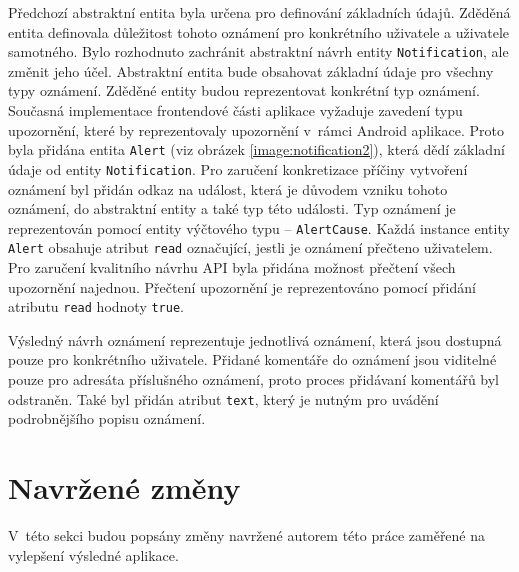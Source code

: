         Předchozí abstraktní entita byla určena pro definování základních údajů. Zděděná entita definovala důležitost tohoto oznámení pro konkrétního uživatele a uživatele samotného. Bylo rozhodnuto zachránit abstraktní návrh entity \verb|Notification|, ale změnit jeho účel. Abstraktní entita bude obsahovat základní údaje pro všechny typy oznámení. Zděděné entity budou reprezentovat konkrétní typ oznámení.
        Současná implementace frontendové části aplikace vyžaduje zavedení typu upozornění, které by reprezentovaly upozornění v~rámci Android aplikace. Proto byla přidána entita \verb|Alert| (viz obrázek \ref{image:notification2}), která dědí základní údaje od entity \verb|Notification|. Pro zaručení konkretizace příčiny vytvoření oznámení byl přidán odkaz na událost, která je důvodem vzniku tohoto oznámení, do abstraktní entity a také typ této události. Typ oznámení je reprezentován pomocí entity výčtového typu -- \verb|AlertCause|. 
        Každá instance entity \verb|Alert| obsahuje atribut \verb|read| označující, jestli je oznámení přečteno uživatelem. Pro zaručení kvalitního návrhu API byla přidána možnost přečtení všech upozornění najednou. Přečtení upozornění je reprezentováno pomocí přidání atributu \verb|read| hodnoty \verb|true|.
        
        Výsledný návrh oznámení reprezentuje jednotlivá oznámení, která jsou dostupná pouze pro konkrétního uživatele. Přidané komentáře do oznámení jsou viditelné pouze pro adresáta příslušného oznámení, proto proces přidávaní komentářů byl odstraněn. Také byl přidán atribut \verb|text|, který je nutným pro uvádění podrobnějšího popisu oznámení.
            
\section{Navržené změny}
    V~této sekci budou popsány změny navržené autorem této práce zaměřené na vylepšení výsledné aplikace.
    

